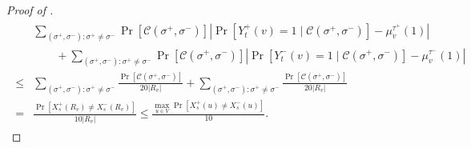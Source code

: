 \documentclass[11pt]{amsart}
\renewcommand{\Pr}{\mathop{\mathrm{Pr}}\nolimits}
\def\+#1{\mathcal{#1}}
\renewcommand{\P}{\Pr}
\theoremstyle{definition}
\theoremstyle{remark}
\begin{document}
\begin{proof}[Proof of ]
\begin{align}
\begin{split}\label{eq:term-1-and-3}
    &\sum_{(\sigma^+,\sigma^-):\sigma^+\neq \sigma^-} \Pr[\mathcal{C}(\sigma^+,\sigma^-)] \left | \P[Y_t^+(v)=1 \mid \mathcal{C}(\sigma^+,\sigma^-)] -\mu_v^{\tau^+}(1) \right |\\
    &\qquad +\sum_{(\sigma^+,\sigma^-):\sigma^+\neq \sigma^-} \Pr[\mathcal{C}(\sigma^+,\sigma^-)] \left | \P[Y_t^-(v)=1 \mid \mathcal{C}(\sigma^+,\sigma^-)] -\mu_v^{\tau^-}(1) \right |\\
    \leq& \sum_{(\sigma^+,\sigma^-):\sigma^+\neq \sigma^-}  \frac{\Pr[\mathcal{C}(\sigma^+,\sigma^-)]}{20|R_v|} + \sum_{(\sigma^+,\sigma^-):\sigma^+\neq \sigma^-}  \frac{\Pr[\mathcal{C}(\sigma^+,\sigma^-)]}{20|R_v|}\\
    =&\frac{\Pr[X_s^+(R_v)\neq X_s^-(R_v)]}{10|R_v|}\leq \frac{\max_{u\in V} \Pr[X_s^+(u)\neq X_s^-(u)]}{10}.
\end{split}
\end{align}


\end{proof}
\end{document}
